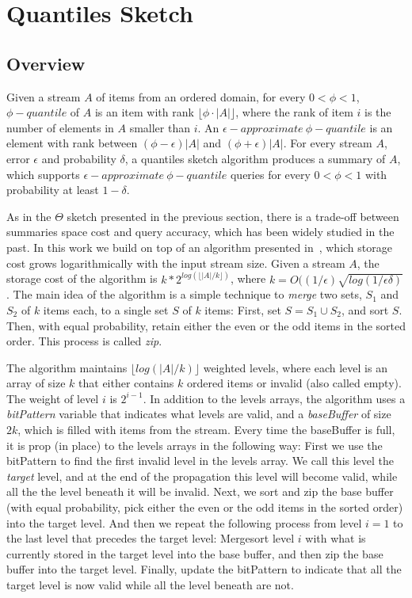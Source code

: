 \section{Quantiles Sketch}
\label{sec:quantiles}

\subsection{Overview}

Given a stream $A$ of items from an ordered domain, for every
$0< \phi < 1$, $\phi - quantile$ of $A$ is an item with rank 
$\lfloor \phi \cdot |A| \rfloor$, where the rank of item $i$ is the
number of elements in $A$ smaller than $i$.
An $\epsilon -approximate ~\phi - quantile$ is an element
with rank between $ (\phi - \epsilon) |A|$ and $ (\phi +
\epsilon) |A|$.
For every stream $A$, error $\epsilon$ and probability $\delta$,
a quantiles sketch algorithm produces a summary of $A$, which
supports $\epsilon -approximate ~\phi - quantile$ queries for
every $0< \phi < 1$ with probability at least $1 - \delta$.

As in the $\Theta$ sketch presented in the previous section, there
is a trade-off between summaries space cost and query accuracy,
which has been widely studied in the past.
In this work we build on top of an algorithm presented
in~\cite{}, which storage cost grows logarithmically with the
input stream size.
Given a stream $A$, the storage cost of the algorithm is
$k*2^{log(\lfloor |A|/k \rfloor)}$, where $k = O((1/\epsilon)
\sqrt{log(1/\epsilon \delta)}$.
The main idea of the algorithm is a simple technique to
\emph{merge} two sets, $S_1$ and $S_2$ of $k$ items each, to a
single set $S$ of $k$ items:
First, set $S = S_1 \cup S_2$, and sort $S$. 
Then, with equal probability, retain either the even or the odd
items in the sorted order. 
This process is called \emph{zip}.


The algorithm maintains $\lfloor log(|A|/k) \rfloor$ weighted
levels, where each level is an array of size $k$ that either contains $k$ ordered
items or invalid (also called empty).
The weight of level $i$ is $2^{i-1}$.
In addition to the levels arrays, the algorithm uses a
\emph{bitPattern} variable that indicates what levels are valid,
and a \emph{baseBuffer} of size $2k$, which is filled with items
from the stream.
Every time the baseBuffer is full, it is prop (in place) to
the levels arrays in the following way:
First we use the bitPattern to find the first invalid level in
the levels array. 
We call this level the \emph{target} level, and at the end of
the propagation this level will become valid, while all the the
level beneath it will be invalid.
Next, we sort and zip the base buffer (with equal probability,
pick either the even or the odd items in the sorted order) into
the target level.
And then we repeat the following process from level $i=1$ to the
last level that precedes the target level:
Mergesort level $i$ with what is currently stored in the target
level into the base buffer, and then zip the base buffer into the
target level.
Finally, update the bitPattern to indicate that all the target
level is now valid while all the level beneath are not.

